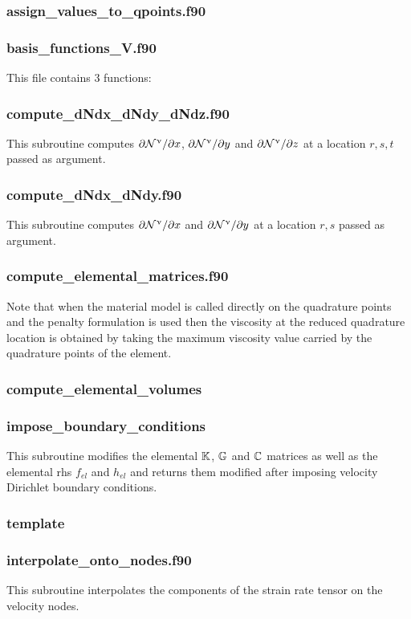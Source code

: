  \subsubsection{assign\_values\_to\_qpoints.f90}

 \subsubsection{basis\_functions\_V.f90}
 This file contains 3 functions: 
 \subsubsection{compute\_dNdx\_dNdy\_dNdz.f90}
 This subroutine computes $\partial{{\mathcal{N}}^\upnu}/\partial x$, $\partial{{\mathcal{N}}^\upnu}/\partial y$ and
 $\partial{{\mathcal{N}}^\upnu}/\partial z$ at a location $r,s,t$ passed as argument.
 \subsubsection{compute\_dNdx\_dNdy.f90}
 This subroutine computes $\partial{{\mathcal{N}}^\upnu}/\partial x$ and $\partial{{\mathcal{N}}^\upnu}/\partial y$
 at a location $r,s$ passed as argument.
 \subsubsection{compute\_elemental\_matrices.f90}
 Note that when the material model is called directly on the quadrature points and 
 the penalty formulation is used then the viscosity at the reduced quadrature location 
 is obtained by taking the maximum viscosity value carried by the quadrature points of 
 the element. 
 \subsubsection{compute\_elemental\_volumes}

 \subsubsection{impose\_boundary\_conditions}
 This subroutine modifies the elemental ${\mathbb{K}}$, ${\mathbb{G}}$ and ${\mathbb{C}}$ matrices as well as the 
 elemental rhs $f_{el}$ and $h_{el}$ and returns them modified after imposing
 velocity Dirichlet boundary conditions.
 \subsubsection{template}

 \subsubsection{interpolate\_onto\_nodes.f90}
 This subroutine interpolates the components of the strain rate tensor on the velocity nodes.
